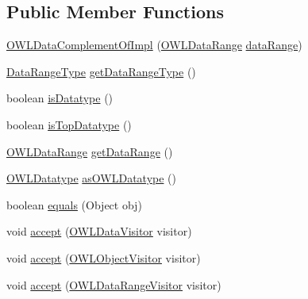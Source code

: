 \subsection*{Public Member Functions}
\begin{DoxyCompactItemize}
\item 
\hyperlink{classuk_1_1ac_1_1manchester_1_1cs_1_1owl_1_1owlapi_1_1_o_w_l_data_complement_of_impl_a67f7ea4dfcdec823c3ef44c5f44e2fab}{O\-W\-L\-Data\-Complement\-Of\-Impl} (\hyperlink{interfaceorg_1_1semanticweb_1_1owlapi_1_1model_1_1_o_w_l_data_range}{O\-W\-L\-Data\-Range} \hyperlink{classuk_1_1ac_1_1manchester_1_1cs_1_1owl_1_1owlapi_1_1_o_w_l_data_complement_of_impl_abf47ed02b4b05d4398a6db311346bd21}{data\-Range})
\item 
\hyperlink{enumorg_1_1semanticweb_1_1owlapi_1_1model_1_1_data_range_type}{Data\-Range\-Type} \hyperlink{classuk_1_1ac_1_1manchester_1_1cs_1_1owl_1_1owlapi_1_1_o_w_l_data_complement_of_impl_ac6d93ebfb2923949f6d9ab57c27203d4}{get\-Data\-Range\-Type} ()
\item 
boolean \hyperlink{classuk_1_1ac_1_1manchester_1_1cs_1_1owl_1_1owlapi_1_1_o_w_l_data_complement_of_impl_a7cbd507b388281f520330d2b5affb873}{is\-Datatype} ()
\item 
boolean \hyperlink{classuk_1_1ac_1_1manchester_1_1cs_1_1owl_1_1owlapi_1_1_o_w_l_data_complement_of_impl_a8831f418241967ed2c49db1b608f59a0}{is\-Top\-Datatype} ()
\item 
\hyperlink{interfaceorg_1_1semanticweb_1_1owlapi_1_1model_1_1_o_w_l_data_range}{O\-W\-L\-Data\-Range} \hyperlink{classuk_1_1ac_1_1manchester_1_1cs_1_1owl_1_1owlapi_1_1_o_w_l_data_complement_of_impl_afa248ead4ca0fe7e36f4504042270c04}{get\-Data\-Range} ()
\item 
\hyperlink{interfaceorg_1_1semanticweb_1_1owlapi_1_1model_1_1_o_w_l_datatype}{O\-W\-L\-Datatype} \hyperlink{classuk_1_1ac_1_1manchester_1_1cs_1_1owl_1_1owlapi_1_1_o_w_l_data_complement_of_impl_a8c35e6a64b7e5bda998c64b9fdfb447e}{as\-O\-W\-L\-Datatype} ()
\item 
boolean \hyperlink{classuk_1_1ac_1_1manchester_1_1cs_1_1owl_1_1owlapi_1_1_o_w_l_data_complement_of_impl_ad40e939decf9f9420ff572cc6e31a94f}{equals} (Object obj)
\item 
void \hyperlink{classuk_1_1ac_1_1manchester_1_1cs_1_1owl_1_1owlapi_1_1_o_w_l_data_complement_of_impl_a06a87368cdc75b85c2a3897ea2cab25c}{accept} (\hyperlink{interfaceorg_1_1semanticweb_1_1owlapi_1_1model_1_1_o_w_l_data_visitor}{O\-W\-L\-Data\-Visitor} visitor)
\item 
void \hyperlink{classuk_1_1ac_1_1manchester_1_1cs_1_1owl_1_1owlapi_1_1_o_w_l_data_complement_of_impl_a8e4cf28ee9848538e2c31f7657db5e96}{accept} (\hyperlink{interfaceorg_1_1semanticweb_1_1owlapi_1_1model_1_1_o_w_l_object_visitor}{O\-W\-L\-Object\-Visitor} visitor)
\item 
void \hyperlink{classuk_1_1ac_1_1manchester_1_1cs_1_1owl_1_1owlapi_1_1_o_w_l_data_complement_of_impl_a60c0a5c34713db5d3ef4cb4006ffa30d}{accept} (\hyperlink{interfaceorg_1_1semanticweb_1_1owlapi_1_1model_1_1_o_w_l_data_range_visitor}{O\-W\-L\-Data\-Range\-Visitor} visitor)
\end{DoxyCompactItemize}
